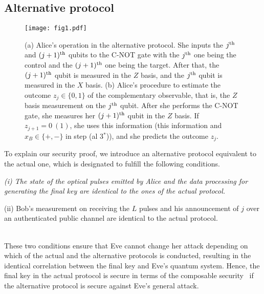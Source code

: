 \documentclass[prl,twocolumn,superscriptaddress,nofootinbib]{revtex4}
\def\U#1{{\rm #1}}
\begin{document}
  \subsection{Alternative protocol}
  \label{sec:alternative}
\begin{figure}[t]
\texttt{[image: fig1.pdf]}
\caption{
  (a) Alice's operation in the alternative protocol.
  She inputs the $j^{\U{th}}$ and $(j+1)^{\U{th}}$ qubits to the C-NOT gate with the $j^{\U{th}}$ one being the control and
  the $(j+1)^{\U{th}}$ one being the target. After that, the $(j+1)^{\U{th}}$ qubit is measured in the $Z$ basis, and
  the $j^{\U{th}}$ qubit is measured in the $X$ basis. 
  (b) Alice's procedure to estimate the outcome $z_j\in\{0,1\}$ of the complementary observable, that is, the $Z$ basis measurement 
  on the $j^{\U{th}}$ qubit. 
  After she performs the C-NOT gate, she measures her $(j+1)^{\U{th}}$ qubit in the $Z$ basis. 
  If $z_{j+1}=0~(1)$, she uses this information
  (this information and $x_B\in\{+,-\}$ in step (al 3$^\ast$)), and she predicts the outcome $z_j$. 
}
  \label{fig:circuit}
          \end{figure}
              To explain our security proof, we introduce an alternative protocol equivalent 
              to the actual one, which is designated to fulfill the following conditions. 
            
              {\it (i) The state of the optical pulses emitted by Alice and 
                the data processing for generating the final key are identical to the ones of the actual protocol. 
  
  (ii) Bob's measurement on receiving the $L$ pulses and his announcement of $j$ over an authenticated public channel 
    are identical to the actual protocol. }
              \\
              These two conditions ensure that Eve cannot change her attack 
              depending on which of the actual and the alternative protocols is conducted,
              resulting in the identical correlation between the final key and Eve's quantum system.
Hence, the final key in the actual protocol is secure in terms of the composable security~\cite{Canetti2001} if
the alternative protocol is secure against Eve's general attack. 
\end{document}
